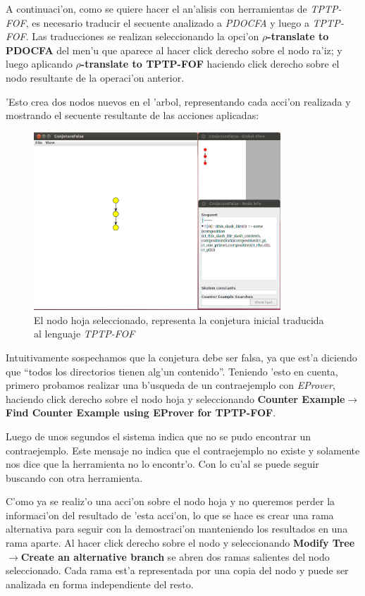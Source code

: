 A continuaci'on, como se quiere hacer el an'alisis con herramientas de \textit{TPTP-FOF}, es necesario traducir el secuente analizado a \textit{PDOCFA} y luego a \textit{TPTP-FOF}. Las traducciones se realizan seleccionando la opci'on \textbf{$\rho$-translate to PDOCFA} del men'u que aparece al hacer click derecho sobre el nodo ra'iz; y luego aplicando \textbf{$\rho$-translate to TPTP-FOF} haciendo click derecho sobre el nodo resultante de la operaci'on anterior. 

'Esto crea dos nodos nuevos en el 'arbol, representando cada acci'on realizada y mostrando el secuente resultante de las acciones aplicadas:

\begin{figure}[H]
	\includegraphics[width=350px]{img/conjetura_falsa_2.png}
	\centering
	\caption{El nodo hoja seleccionado, representa la conjetura inicial traducida al lenguaje \textit{TPTP-FOF}}
\end{figure}

Intuitivamente sospechamos que la conjetura debe ser falsa, ya que est'a diciendo que ``todos los directorios tienen alg'un contenido''. Teniendo 'esto en cuenta, primero probamos realizar una b'usqueda de un contraejemplo con \textit{EProver}, haciendo click derecho sobre el nodo hoja y seleccionando \textbf{Counter Example$\rightarrow$Find Counter Example using EProver for TPTP-FOF}.

Luego de unos segundos el sistema indica que no se pudo encontrar un contraejemplo. Este mensaje no indica que el contraejemplo no existe y solamente nos dice que la herramienta no lo encontr'o. Con lo cu'al se puede seguir buscando con otra herramienta.

C'omo ya se realiz'o una acci'on sobre el nodo hoja y no queremos perder la informaci'on del resultado de 'esta acci'on, lo que se hace es crear una rama alternativa para seguir con la demostraci'on manteniendo los resultados en una rama aparte. Al hacer click derecho sobre el nodo y seleccionando \textbf{Modify Tree$\rightarrow$Create an alternative branch} se abren dos ramas salientes del nodo seleccionado. Cada rama est'a representada por una copia del nodo y puede ser analizada en forma independiente del resto.

